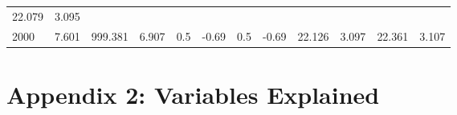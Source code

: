 \documentclass{article}
\begin{document}
\begin{longtable}[]{@{}llllllllllll@{}}
\begin{minipage}[t]{0.06\columnwidth}
22.079\strut
\end{minipage} & \begin{minipage}[t]{0.09\columnwidth}\raggedright\strut
3.095\strut
\end{minipage}\tabularnewline
\begin{minipage}[t]{0.03\columnwidth}\raggedright\strut
2000\strut
\end{minipage} & \begin{minipage}[t]{0.06\columnwidth}\raggedright\strut
7.601\strut
\end{minipage} & \begin{minipage}[t]{0.06\columnwidth}\raggedright\strut
999.381\strut
\end{minipage} & \begin{minipage}[t]{0.08\columnwidth}\raggedright\strut
6.907\strut
\end{minipage} & \begin{minipage}[t]{0.03\columnwidth}\raggedright\strut
0.5\strut
\end{minipage} & \begin{minipage}[t]{0.06\columnwidth}\raggedright\strut
-0.69\strut
\end{minipage} & \begin{minipage}[t]{0.03\columnwidth}\raggedright\strut
0.5\strut
\end{minipage} & \begin{minipage}[t]{0.06\columnwidth}\raggedright\strut
-0.69\strut
\end{minipage} & \begin{minipage}[t]{0.06\columnwidth}\raggedright\strut
22.126\strut
\end{minipage} & \begin{minipage}[t]{0.08\columnwidth}\raggedright\strut
3.097\strut
\end{minipage} & \begin{minipage}[t]{0.06\columnwidth}\raggedright\strut
22.361\strut
\end{minipage} & \begin{minipage}[t]{0.09\columnwidth}\raggedright\strut
3.107\strut
\end{minipage}\tabularnewline
\bottomrule
\end{longtable}

\newpage
    
    \section{Appendix 2: Variables
Explained}\label{appendix-2-variables-explained}
\end{document}
